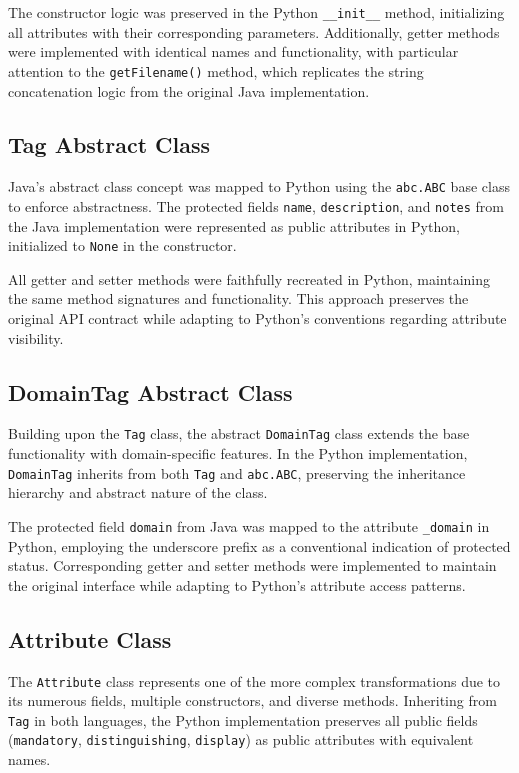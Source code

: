 \documentclass[12pt,a4paper]{article}
\begin{document}
The constructor logic was preserved in the Python \texttt{\_\_init\_\_} method, initializing all attributes with their corresponding parameters. Additionally, getter methods were implemented with identical names and functionality, with particular attention to the \texttt{getFilename()} method, which replicates the string concatenation logic from the original Java implementation.

\subsection{Tag Abstract Class}Java's abstract class concept was mapped to Python using the \texttt{abc.ABC} base class to enforce abstractness. The protected fields \texttt{name}, \texttt{description}, and \texttt{notes} from the Java implementation were represented as public attributes in Python, initialized to \texttt{None} in the constructor.

All getter and setter methods were faithfully recreated in Python, maintaining the same method signatures and functionality. This approach preserves the original API contract while adapting to Python's conventions regarding attribute visibility.

\subsection{DomainTag Abstract Class}
Building upon the \texttt{Tag} class, the abstract \texttt{DomainTag} class extends the base functionality with domain-specific features. In the Python implementation, \texttt{DomainTag} inherits from both \texttt{Tag} and \texttt{abc.ABC}, preserving the inheritance hierarchy and abstract nature of the class.

The protected field \texttt{domain} from Java was mapped to the attribute \texttt{\_domain} in Python, employing the underscore prefix as a conventional indication of protected status. Corresponding getter and setter methods were implemented to maintain the original interface while adapting to Python's attribute access patterns.

\subsection{Attribute Class}
The \texttt{Attribute} class represents one of the more complex transformations due to its numerous fields, multiple constructors, and diverse methods. Inheriting from \texttt{Tag} in both languages, the Python implementation preserves all public fields (\texttt{mandatory}, \texttt{distinguishing}, \texttt{display}) as public attributes with equivalent names.
\end{document}
